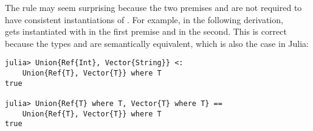 The rule  may seem surprising because the two premises
 and
 are not required
to have consistent instantiations of \UEnv.
For example, in the following derivation,\\
\va gets instantiated with \tyint in the first premise and
\tystr in the second.
This is correct because the types
 and
are semantically equivalent, which is also the case in Julia:
\begin{center}
\begin{minipage}{8cm}
\begin{lstlisting}
julia> Union{Ref{Int}, Vector{String}} <: 
    Union{Ref{T}, Vector{T}} where T
true

julia> Union{Ref{T} where T, Vector{T} where T} == 
    Union{Ref{T}, Vector{T}} where T
true
\end{lstlisting}
\end{minipage}
\end{center}

